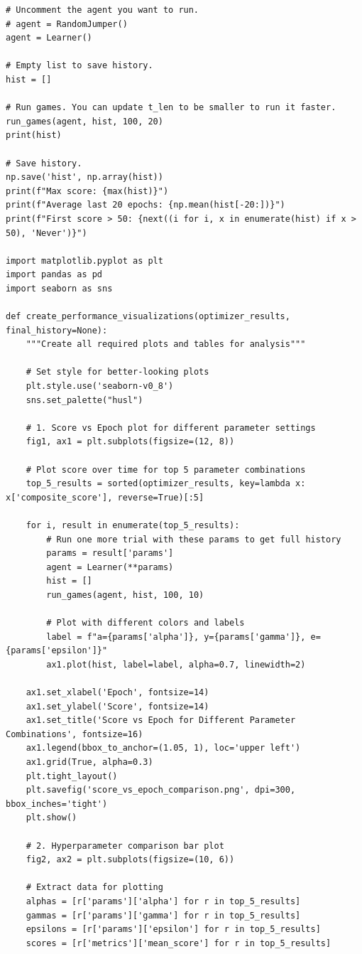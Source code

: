 \documentclass[submit]{../harvardml}
\begin{document}
\begin{lstlisting}
# Uncomment the agent you want to run.
# agent = RandomJumper()
agent = Learner()

# Empty list to save history.
hist = []

# Run games. You can update t_len to be smaller to run it faster.
run_games(agent, hist, 100, 20)  
print(hist)

# Save history. 
np.save('hist', np.array(hist))
print(f"Max score: {max(hist)}")
print(f"Average last 20 epochs: {np.mean(hist[-20:])}")
print(f"First score > 50: {next((i for i, x in enumerate(hist) if x > 50), 'Never')}")

import matplotlib.pyplot as plt
import pandas as pd
import seaborn as sns

def create_performance_visualizations(optimizer_results, final_history=None):
    """Create all required plots and tables for analysis"""
    
    # Set style for better-looking plots
    plt.style.use('seaborn-v0_8')
    sns.set_palette("husl")
    
    # 1. Score vs Epoch plot for different parameter settings
    fig1, ax1 = plt.subplots(figsize=(12, 8))
    
    # Plot score over time for top 5 parameter combinations
    top_5_results = sorted(optimizer_results, key=lambda x: x['composite_score'], reverse=True)[:5]
    
    for i, result in enumerate(top_5_results):
        # Run one more trial with these params to get full history
        params = result['params']
        agent = Learner(**params)
        hist = []
        run_games(agent, hist, 100, 10)
        
        # Plot with different colors and labels
        label = f"a={params['alpha']}, y={params['gamma']}, e={params['epsilon']}"
        ax1.plot(hist, label=label, alpha=0.7, linewidth=2)
    
    ax1.set_xlabel('Epoch', fontsize=14)
    ax1.set_ylabel('Score', fontsize=14)
    ax1.set_title('Score vs Epoch for Different Parameter Combinations', fontsize=16)
    ax1.legend(bbox_to_anchor=(1.05, 1), loc='upper left')
    ax1.grid(True, alpha=0.3)
    plt.tight_layout()
    plt.savefig('score_vs_epoch_comparison.png', dpi=300, bbox_inches='tight')
    plt.show()
    
    # 2. Hyperparameter comparison bar plot
    fig2, ax2 = plt.subplots(figsize=(10, 6))
    
    # Extract data for plotting
    alphas = [r['params']['alpha'] for r in top_5_results]
    gammas = [r['params']['gamma'] for r in top_5_results]
    epsilons = [r['params']['epsilon'] for r in top_5_results]
    scores = [r['metrics']['mean_score'] for r in top_5_results]
    

\end{lstlisting}
\end{document}
